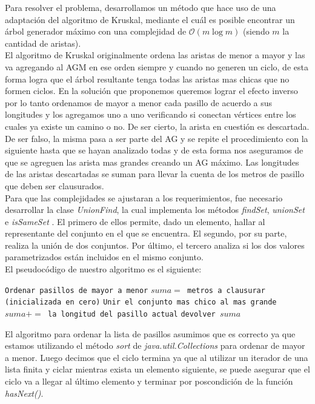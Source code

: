 Para resolver el problema, desarrollamos un método que hace uso de una adaptación del algoritmo de Kruskal, mediante el cuál es posible encontrar un árbol generador máximo con una complejidad de $\mathcal{O}(m\log{}m)$ (siendo $m$ la cantidad de aristas).\\
El algoritmo de Kruskal originalmente ordena las aristas de menor a mayor y las va agregando al AGM en ese orden siempre y cuando no generen un ciclo, de esta forma logra que el árbol resultante tenga todas las aristas mas chicas que no formen ciclos. En la solución que proponemos queremos lograr el efecto inverso por lo tanto ordenamos de mayor a menor cada pasillo de acuerdo a sus longitudes y los agregamos uno a uno verificando si conectan vértices entre los cuales ya existe un camino o no. De ser cierto, la arista en cuestión es descartada. De ser falso, la misma pasa a ser parte del AG y se repite el procedimiento con la siguiente hasta que se hayan analizado todas y de esta forma nos aseguramos de que se agreguen las arista mas grandes creando un AG máximo. Las longitudes de las aristas descartadas se suman para llevar la cuenta de los metros de pasillo que deben ser clausurados.\\

Para que las complejidades se ajustaran a los requerimientos, fue necesario desarrollar la clase \textit{UnionFind}, la cual implementa los métodos \textit{findSet}, \textit{unionSet} e \textit{isSameSet} . El primero de ellos permite, dado un elemento, hallar al representante del conjunto en el que se encuentra. El segundo, por su parte, realiza la unión de dos conjuntos. Por último, el tercero analiza si los dos valores parametrizados están incluidos en el mismo conjunto. \\

El pseudocódigo de nuestro algoritmo es el siguiente:

\begin{algorithmic} 

\STATE \texttt{Ordenar pasillos de mayor a menor}
\STATE \texttt{$suma = $ metros a clausurar (inicializada en cero)}
		\STATE \texttt{Unir el conjunto mas chico al mas grande}
	\ELSE
		\STATE \texttt{$suma += $ la longitud del pasillo actual}
	\ENDIF
\ENDFOR
\STATE \texttt{devolver $suma$}
\end{algorithmic} 


El algoritmo para ordenar la lista de pasillos asumimos que es correcto ya que estamos utilizando el método \textit{sort} de \emph{java.util.Collections} para ordenar de mayor a menor. Luego decimos que el ciclo termina ya que al utilizar un iterador de una lista finita y ciclar mientras exista un elemento siguiente, se puede asegurar que el ciclo va a llegar al último elemento y terminar por poscondición de la función \textit{hasNext()}.\\

